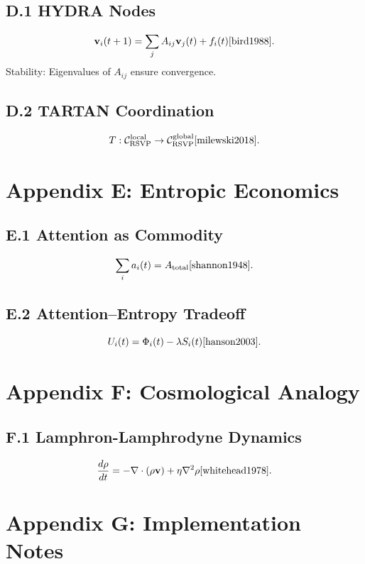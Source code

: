 \documentclass[12pt]{article}
\begin{document}
{{\subsection*{D.1 HYDRA Nodes}

\[
\mathbf{v}_i(t+1) = \sum_j A_{ij} \mathbf{v}_j(t) + f_i(t) \cite{bird1988}.
\]
Stability: Eigenvalues of \(A_{ij}\) ensure convergence.

\subsection*{D.2 TARTAN Coordination}

\[
T: \mathcal{C}_{\text{RSVP}}^{\text{local}} \to \mathcal{C}_{\text{RSVP}}^{\text{global}} \cite{milewski2018}.
\]

\section*{Appendix E: Entropic Economics}

\subsection*{E.1 Attention as Commodity}

\[
\sum_i a_i(t) = A_{\text{total}} \cite{shannon1948}.
\]

\subsection*{E.2 Attention–Entropy Tradeoff}

\[
U_i(t) = \Phi_i(t) - \lambda S_i(t) \cite{hanson2003}.
\]

\section*{Appendix F: Cosmological Analogy}

\subsection*{F.1 Lamphron-Lamphrodyne Dynamics}

\[
\frac{d \rho}{dt} = -\nabla \cdot (\rho \mathbf{v}) + \eta \nabla^2 \rho \cite{whitehead1978}.
\]

\section*{Appendix G: Implementation Notes}

}}
\end{document}
